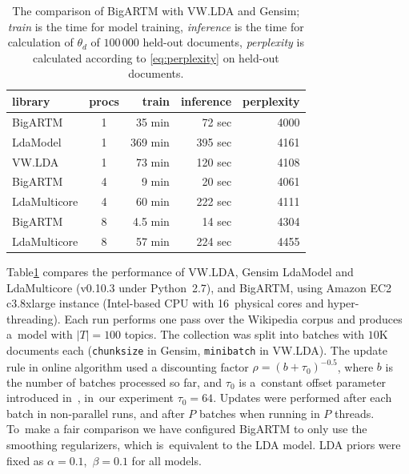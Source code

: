 \documentclass{acm_proc_article-sp}
\begin{document}
\begin{table}[t]
	\caption{
        The comparison of BigARTM with VW.LDA and Gensim;
        \emph{train} is the time for model training,
        \emph{inference} is the time for calculation of $\theta_d$ of $100\,000$ held-out documents,
        \emph{perplexity} is calculated according to \eqref{eq:perplexity} on held-out documents.
    }
	\label{tab:libraries_comparison}
    \centering\tabcolsep=4.3pt
	\begin{tabular}[t]{l|c|rrr}
	\hline
	library & procs & train & inference & perplexity \\
	\hline
	BigARTM & 1 & 35 min & 72 sec & 4000 \\
	LdaModel & 1 & 369 min & 395 sec & 4161  \\
	VW.LDA & 1 & 73 min & 120 sec & 4108 \\
	\hline
	BigARTM & 4 & 9 min & 20 sec & 4061  \\
	LdaMulticore & 4 & 60 min & 222 sec & 4111  \\	
	\hline
	BigARTM & 8 & 4.5 min & 14 sec & 4304  \\
	LdaMulticore & 8 & 57 min & 224 sec & 4455 \\
	\hline
	\end{tabular}
\end{table}
%

Table\;\ref{tab:libraries_comparison} compares the performance of
VW.LDA, Gensim LdaModel and LdaMulticore (\mbox{v0.10.3} under Python~\mbox{2.7}), and BigARTM,
using Amazon EC2 c3.8xlarge instance (Intel-based CPU with 16~physical cores and hyper-threading).
%
Each run performs one pass over the Wikipedia corpus and produces a~model with $|T|=100$ topics.
The collection was split into batches with $10$K documents each
(\texttt{chunksize} in Gensim, \texttt{minibatch} in VW.LDA).
The update rule in online algorithm used a discounting factor
${\rho = (b + \tau_0)^{-0.5}}$,
where $b$ is the number of batches processed so far,
and $\tau_0$ is a~constant offset parameter introduced in~\cite{hoffman10online},
in~our experiment ${\tau_0 = 64}$.
\mbox{Updates} were performed after each batch in non-parallel runs, and after $P$ batches when running in $P$ threads.
To~make a fair comparison we have configured BigARTM to only use the smoothing regularizers, which is~equivalent to the LDA model.
LDA priors were fixed as ${\alpha = 0.1}$,\, ${\beta = 0.1}$ for all models.
\end{document}
